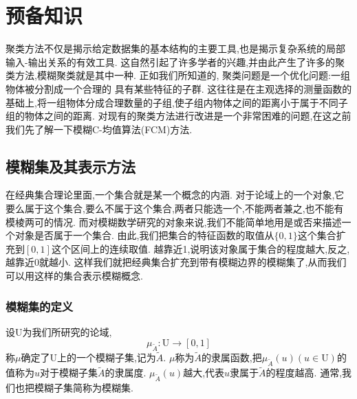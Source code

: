 \chapter[预备知识]{预备知识}
聚类方法不仅是揭示给定数据集的基本结构的主要工具,也是揭示复杂系统的局部输入-输出关系的有效工具.
这自然引起了许多学者的兴趣,并由此产生了许多的聚类方法,模糊聚类就是其中一种.
正如我们所知道的, 聚类问题是一个优化问题:一组物体被分割成一个合理的 具有某些特征的子群.
这往往是在主观选择的测量函数的基础上,将一组物体分成合理数量的子组,使子组内物体之间的距离小于属于不同子组的物体之间的距离.
对现有的聚类方法进行改进是一个非常困难的问题,在这之前我们先了解一下模糊C-均值算法(FCM)方法.
\section{模糊集及其表示方法}
\par
在经典集合理论里面,一个集合就是某一个概念的内涵.
对于论域上的一个对象,它要么属于这个集合,要么不属于这个集合,两者只能选一个,不能两者兼之,也不能有模棱两可的情况.
而对模糊数学研究的对象来说,我们不能简单地用是或否来描述一个对象是否属于一个集合.
由此,我们把集合的特征函数的取值从$\{0,1\}$这个集合扩充到$[0,1]$这个区间上的连续取值.
越靠近1,说明该对象属于集合的程度越大,反之,越靠近0就越小.
这样我们就把经典集合扩充到带有模糊边界的模糊集了,从而我们可以用这样的集合表示模糊概念.
\subsection{模糊集的定义}
\begin{definition}
    设$\mathrm{U}$为我们所研究的论域,
    \[
        \mu_{\tilde{A}}: \mathrm{U} \longrightarrow[0,1]
    \]
    称$\mu$确定了$\mathrm{U}$上的一个模糊子集,记为$\tilde{A}$.
    $\mu$称为$\tilde{A}$的隶属函数,把$\mu_{\tilde{A}}(u)(u \in \mathrm{U})$的值称为$u$对于模糊子集$\tilde{A}$的隶属度.
    $\mu_{\tilde{A}}(u)$越大,代表$u$隶属于$\tilde{A}$的程度越高.
    通常,我们也把模糊子集简称为模糊集.
\end{definition}

